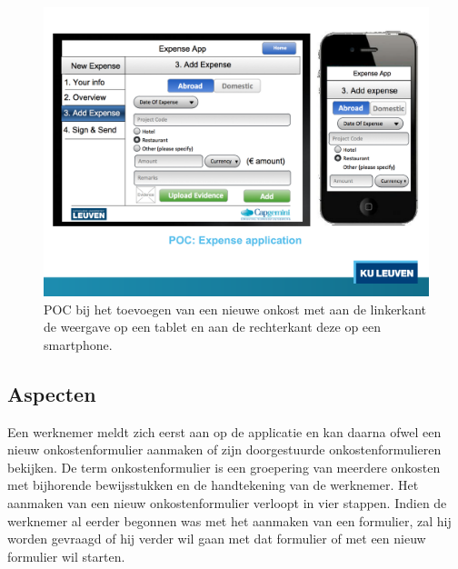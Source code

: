 \begin{figure}
  \centering
  \includegraphics[trim=0cm 4.6cm 0cm 1.55cm,clip=true,width=\textwidth]{figuren/poc.pdf}
  \caption{POC bij het toevoegen van een nieuwe onkost met aan de linkerkant de weergave op een tablet en aan de rechterkant deze op een smartphone.}
  \label{fig:poc}
\end{figure}

\subsection{Aspecten}
\label{sec:vergelijking-poc-detail}

Een werknemer meldt zich eerst aan op de applicatie en kan daarna ofwel een nieuw onkostenformulier aanmaken of zijn doorgestuurde onkostenformulieren bekijken.
De term onkostenformulier is een groepering van meerdere onkosten met bijhorende bewijsstukken en de handtekening van de werknemer. 
Het aanmaken van een nieuw onkostenformulier verloopt in vier stappen.
Indien de werknemer al eerder begonnen was met het aanmaken van een formulier, zal hij worden gevraagd of hij verder wil gaan met dat formulier of met een nieuw formulier wil starten.

